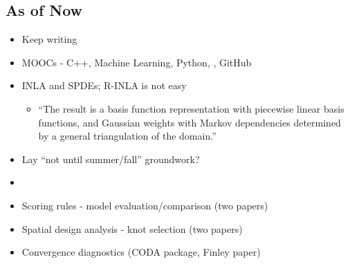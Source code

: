 \documentclass{article}
\begin{document}
\subsection*{As of Now}
\begin{itemize}
\item Keep writing
\item MOOCs - C++, Machine Learning, Python, , GitHub
\item INLA and SPDEs; R-INLA is not easy
  \begin{itemize}
  \item ``The result is a basis function representation with piecewise linear basis functions, and Gaussian weights with Markov dependencies determined by a general triangulation of the domain.'' \citep{Lindgren2011}
  \end{itemize}
\item Lay ``not until summer/fall'' groundwork?
\item 
\item Scoring rules - model evaluation/comparison (two papers)
\item Spatial design analysis - knot selection (two papers)
\item Convergence diagnostics (CODA package, Finley paper)
\end{itemize}

% 

\end{document}
